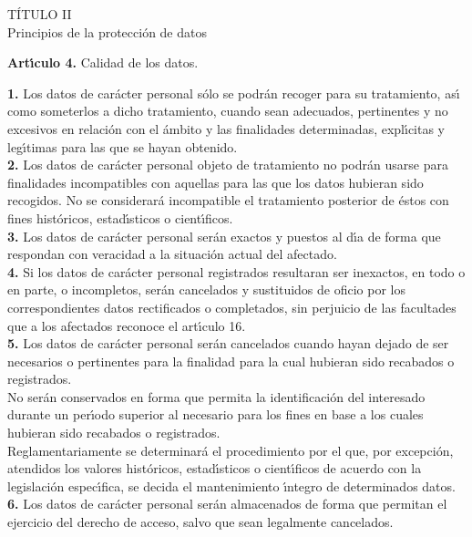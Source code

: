 \begin{center}
{\LARGE T\'ITULO II}\\
{\large Principios de la protecci\'on de datos}
\end{center} 
{\large {\bf Art\'{\i}culo 4.} Calidad de los datos.}

{\bf 1.} Los datos de car\'acter personal s\'olo se podr\'an recoger para su 
tratamiento, as\'{\i} como someterlos a dicho tratamiento, cuando sean 
adecuados, pertinentes y no excesivos en relaci\'on con el \'ambito y las 
finalidades determinadas, expl\'{\i}citas y leg\'{\i}timas para las que se 
hayan obtenido.\\

{\bf 2.} Los datos de car\'acter personal objeto de tratamiento no podr\'an 
usarse para finalidades incompatibles con aquellas para las que los datos 
hubieran sido recogidos. No se considerar\'a incompatible el tratamiento 
posterior de \'estos con fines hist\'oricos, estad\'{\i}sticos o 
cient\'{\i}ficos.\\

{\bf 3.} Los datos de car\'acter personal ser\'an exactos y puestos al d\'{\i}a 
de forma que respondan con veracidad a la situaci\'on actual del afectado.\\

{\bf 4.} Si los datos de car\'acter personal registrados resultaran ser 
inexactos, en todo o en parte, o incompletos, ser\'an cancelados y sustituidos 
de oficio por los correspondientes datos rectificados o completados, sin 
perjuicio de las facultades que a los afectados reconoce el art\'{\i}culo 16.\\

{\bf 5.} Los datos de car\'acter personal ser\'an cancelados cuando hayan 
dejado de ser necesarios o pertinentes para la finalidad para la cual hubieran 
sido recabados o registrados.\\
No ser\'an conservados en forma que permita la identificaci\'on del interesado 
durante un per\'{\i}odo superior al necesario para los fines en base a los 
cuales hubieran sido recabados o registrados.\\
Reglamentariamente se determinar\'a el procedimiento por el que, por 
excepci\'on, atendidos los valores hist\'oricos, estad\'{\i}sticos o 
cient\'{\i}ficos de acuerdo con la legislaci\'on espec\'{\i}fica, se decida el 
mantenimiento \'{\i}ntegro de determinados datos.\\

{\bf 6.} Los datos de car\'acter personal ser\'an almacenados de forma que 
permitan el ejercicio del derecho de acceso, salvo que sean legalmente 
cancelados.\\

